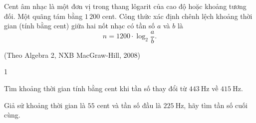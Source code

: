 \begin{bt}%
	Cent âm nhạc là một đơn vị trong thang lôgarit của cao độ hoặc khoảng tương đối. Một quãng tám bằng $ 1\,200 $ cent. Công thức xác định chênh lệch khoảng thời gian (tính bằng cent) giữa hai nốt nhạc có tần số $a$ và $b$ là
	$$n=1200 \cdot \log_2 \dfrac{a}{b}.$$
	\begin{flushright}
		(Theo Algebra 2, NXB MacGraw-Hill, 2008)
	\end{flushright}
	\begin{enumEX}{1}
		\item Tìm khoảng thời gian tính bằng cent khi tần số thay đổi từ $443 \mathrm{~Hz}$ về $415 \mathrm{~Hz}$.
		\item Giả sử khoảng thời gian là $ 55 $ cent và tần số đầu là $225 \mathrm{~Hz}$, hãy tìm tần số cuối cùng.
	\end{enumEX}
\end{bt}